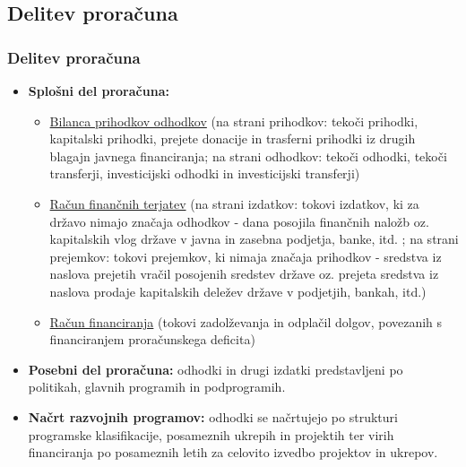 \documentclass[10pt]{beamer}
\begin{document}
\begin{frame}
\subsection[Deitev propračuna]{Delitev proračuna}
\frametitle{Delitev proračuna}
	\begin{itemize}
	\item \textbf{Splošni del proračuna:}
		\begin{itemize}
		\item \underline{Bilanca prihodkov odhodkov} (na strani prihodkov: tekoči prihodki, kapitalski prihodki, prejete donacije in trasferni prihodki iz drugih blagajn javnega financiranja; na strani odhodkov: tekoči odhodki, tekoči transferji, investicijski odhodki in investicijski transferji)
		\item \underline{Račun finančnih terjatev} (na strani izdatkov: tokovi izdatkov, ki za državo nimajo značaja odhodkov - dana posojila finančnih naložb oz. kapitalskih vlog države v javna in zasebna podjetja, banke, itd. ; na strani prejemkov: tokovi prejemkov, ki nimaja značaja prihodkov - sredstva iz naslova prejetih vračil posojenih sredstev države oz. prejeta sredstva iz naslova prodaje kapitalskih deležev države v podjetjih, bankah, itd.)
		\item \underline{Račun financiranja} (tokovi zadolževanja in odplačil dolgov, povezanih s financiranjem proračunskega deficita)
		\end{itemize}
	\item \textbf{Posebni del proračuna:} odhodki in drugi izdatki predstavljeni po politikah, glavnih programih in podprogramih.
	\item \textbf{Načrt razvojnih programov:} odhodki se načrtujejo po strukturi programske klasifikacije, posameznih ukrepih in projektih ter virih financiranja po  posameznih letih za celovito izvedbo projektov in ukrepov.
	\end{itemize}
\end{frame}
\end{document}
